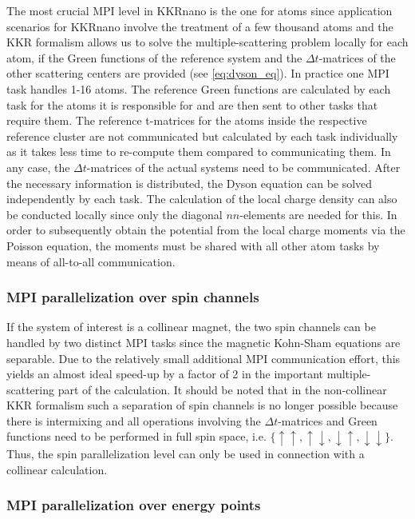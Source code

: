 \documentclass[graybox]{svmult}
\begin{document}
The most crucial MPI level in KKRnano is the one for atoms since application scenarios for KKRnano
involve the treatment of a few thousand atoms and the KKR formalism allows us to solve the
multiple-scattering problem locally for each atom, if the Green functions of the reference system and
the $\Delta t$-matrices of the other scattering centers are provided (see \cref{eq:dyson_eq}).
In practice one MPI task handles 1-16 atoms.
The reference Green functions are calculated by each task
for the atoms it is responsible for and are then sent to other tasks that require them. 
The reference t-matrices for the atoms inside the respective reference cluster are not communicated 
but calculated by each task individually as it takes less time to re-compute them compared to communicating them.
In any case, the $\Delta t$-matrices of the actual systems need to be communicated.
After the necessary information is distributed, the Dyson equation can be solved independently by each task.
The calculation of the local charge density can also be conducted locally since only the diagonal
$nn$-elements are needed for this.
In order to subsequently obtain the potential from the local charge moments via the Poisson equation,
the moments must be shared with all other atom tasks by means of all-to-all communication.

\subsubsection*{MPI parallelization over spin channels}

If the system of interest is a collinear magnet, the two spin channels can be handled by two distinct
MPI tasks since the
magnetic Kohn-Sham equations are separable.
Due to the relatively small additional MPI communication effort,
this yields an almost ideal speed-up by a factor of 2 in the important
multiple-scattering part of the calculation.
It should be noted that in the non-collinear KKR formalism such a 
separation of spin channels is no longer possible because 
there is intermixing and all operations involving the
$\Delta t$-matrices and Green functions
need to be performed in full spin space, i.e. $\{\uparrow \uparrow, \uparrow \downarrow,
\downarrow \uparrow, \downarrow \downarrow \}$.
Thus, the spin parallelization level can only be used in connection with
a collinear calculation.


\subsubsection*{MPI parallelization over energy points}
\end{document}
